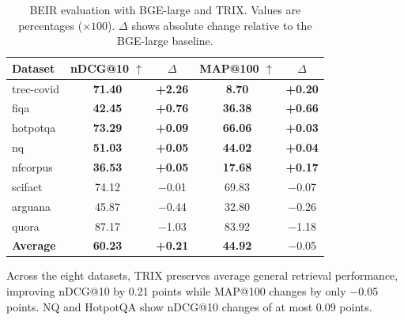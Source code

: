 \documentclass[letterpaper]{article}
\newcommand{\method}{\ifmmode \mathrm{TRIX}\else TRIX\xspace\fi}
\begin{document}
\begin{table}[t]
\centering
\small
\setlength{\tabcolsep}{4pt}
\begin{tabular}{lcccc}
\toprule
\textbf{Dataset} & \textbf{nDCG@10 $\uparrow$} & \textbf{$\Delta$} &
\textbf{MAP@100 $\uparrow$} & \textbf{$\Delta$} \\
\midrule
trec-covid & \textbf{71.40} & \textbf{+2.26} & \textbf{8.70} & \textbf{+0.20} \\
fiqa & \textbf{42.45} & \textbf{+0.76} & \textbf{36.38} & \textbf{+0.66} \\
hotpotqa & \textbf{73.29} & \textbf{+0.09} & \textbf{66.06} & \textbf{+0.03} \\
nq & \textbf{51.03} & \textbf{+0.05} & \textbf{44.02} & \textbf{+0.04} \\
nfcorpus & \textbf{36.53} & \textbf{+0.05} & \textbf{17.68} & \textbf{+0.17} \\
scifact & 74.12 & $-$0.01 & 69.83 & $-$0.07 \\
arguana & 45.87 & $-$0.44 & 32.80 & $-$0.26 \\
quora & 87.17 & $-$1.03 & 83.92 & $-$1.18 \\
\midrule
\textbf{Average} & \textbf{60.23} & \textbf{+0.21} & \textbf{44.92} & $-$0.05 \\
\bottomrule
\end{tabular}
\caption{BEIR evaluation with BGE-large and \method{}.  Values are percentages
($\times100$).  $\Delta$ shows absolute change relative to the BGE-large
baseline.}
\label{tab:beir-results}
\end{table}

Across the eight datasets, \method{} preserves average general retrieval
performance, improving nDCG@10 by 0.21 points while MAP@100 changes by only
$-$0.05 points.  NQ and HotpotQA show nDCG@10 changes of at most 0.09 points.
\end{document}
